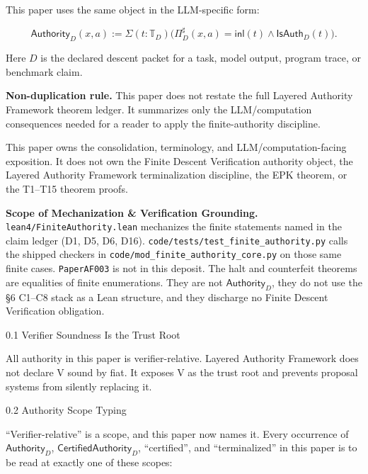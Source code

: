 \documentclass[
  10pt,
]{article}
\DeclareRobustCommand{\texttt}[1]{{\paperSymbolFont\nolinkurl{#1}}}
\begin{document}
This paper uses the same object in the LLM-specific form:

\protect\hypertarget{math-E0008-0009}{}{\[
\mathsf{Authority}_D(x,a)
:=
\Sigma(t:\mathbb T_D)
\bigl(
\Pi_D^\sharp(x,a)=\mathsf{inl}(t)
\wedge
\mathsf{IsAuth}_D(t)
\bigr).
\]}

Here \protect\hypertarget{math-E0009-0010}{}{\(D\)} is the declared descent packet for a task, model output, program trace, or benchmark claim.

\textbf{Non-duplication rule.} This paper does not restate the full Layered Authority Framework theorem ledger. It summarizes only the LLM/computation consequences needed for a reader to apply the finite-authority discipline.

This paper owns the consolidation, terminology, and LLM/computation-facing exposition. It does not own the Finite Descent Verification authority object, the Layered Authority Framework terminalization discipline, the EPK theorem, or the T1--T15 theorem proofs.

\textbf{Scope of Mechanization \& Verification Grounding.} \texttt{lean4/FiniteAuthority.lean} mechanizes the finite statements named in the claim ledger (D1, D5, D6, D16). \texttt{code/tests/test\_finite\_authority.py} calls the shipped checkers in \texttt{code/mod\_finite\_authority\_core.py} on those same finite cases. \texttt{PaperAF003} is not in this deposit. The halt and counterfeit theorems are equalities of finite enumerations. They are not \protect\hypertarget{math-E0010-0011}{}{\(\mathsf{Authority}_D\)}, they do not use the §6 C1--C8 stack as a Lean structure, and they discharge no Finite Descent Verification obligation.

0.1 Verifier Soundness Is the Trust Root

All authority in this paper is verifier-relative. Layered Authority Framework does not declare V sound by fiat. It exposes V as the trust root and prevents proposal systems from silently replacing it.

0.2 Authority Scope Typing

``Verifier-relative'' is a scope, and this paper now names it. Every occurrence of \protect\hypertarget{math-E0010-0012}{}{\(\mathsf{Authority}_D\)}, \protect\hypertarget{math-E0011-0013}{}{\(\mathsf{CertifiedAuthority}_D\)}, ``certified'', and ``terminalized'' in this paper is to be read at exactly one of these scopes:
\end{document}
